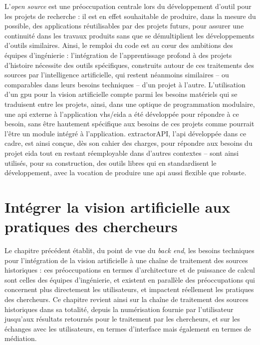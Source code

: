 \documentclass[a4paper,12pt,twoside]{book}
\newcommand{\gpu}{\gls{gpu}\xspace}
\newcommand{\exapi}{extractorAPI\xspace}
\newcommand{\api}{\gls{api}\xspace}
\newcommand{\eida}{\gls{eida}\xspace}
\newcommand{\vhs}{\gls{vhs}\xspace}
\newcommand{\ia}{intelligence artificielle\xspace}
\begin{document}
        L'\textit{open source} est une préoccupation centrale lors du développement d'outil pour les projets de recherche : il est en effet souhaitable de produire, dans la mesure du possible, des applications réutilisables par des projets futurs, pour assurer une continuité dans les travaux produits sans que se démultiplient les développements d'outils similaires. Ainsi, le remploi du code est au cœur des ambitions des équipes d'ingénierie : l'intégration de l'apprentissage profond à des projets d'histoire nécessite des outils spécifiques, construits autour de ces traitements des sources par l'\ia, qui restent néanmoins similaires -- ou comparables dans leurs besoins techniques -- d'un projet à l'autre. L'utilisation d'un \gpu pour la vision artificielle compte parmi les besoins matériels qui se traduisent entre les projets, ainsi, dans une optique de programmation modulaire, une \api externe à l'application \vhs/\eida a été développée pour répondre à ce besoin, sans être hautement spécifique aux besoins de ces projets comme pourrait l'être un module intégré à l'application. \exapi, l'\api développée dans ce cadre, est ainsi conçue, dès son cahier des charges, pour répondre aux besoins du projet \eida tout en restant réemployable dans d'autres contextes -- sont ainsi utilisés, pour sa construction, des outils libres qui en standardisent le développement, avec la vocation de produire une \api aussi flexible que robuste.
        
      	\chapter[\textit{Computer vision} et pratiques des chercheurs]{Intégrer la vision artificielle aux pratiques des chercheurs}
      	
      	Le chapitre précédent établit, du point de vue du \textit{back end}, les besoins techniques pour l'intégration de la vision artificielle à une chaîne de traitement des sources historiques : ces préoccupations en termes d'architecture et de puissance de calcul sont celles des équipes d'ingénierie, et existent en parallèle des préoccupations qui concernent plus directement les utilisateurs, et impactent réellement les pratiques des chercheurs. Ce chapitre revient ainsi sur la chaîne de traitement des sources historiques dans sa totalité, depuis la numérisation fournie par l'utilisateur jusqu'aux résultats retournés pour le traitement par les chercheurs, et sur les échanges avec les utilisateurs, en termes d'interface mais également en termes de médiation.
               
\end{document}
